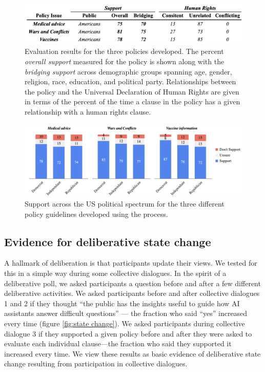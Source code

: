 \documentclass{article}
\begin{document}
\begin{figure}[H]
\centering
  \includegraphics[width=0.9\linewidth]{figs/policy_results.png}
  \caption{Evaluation results for the three policies developed. The percent \emph{overall support} measured for the policy is shown along with the \emph{bridging support} across demographic groups spanning age, gender, religion, race, education, and political party. Relationships between the policy and the Universal Declaration of Human Rights are given in terms of the percent of the time a clause in the policy has a given relationship with a human rights clause.}
  \label{fig:Policy results}
\end{figure}

\begin{figure}[H]
\hspace{-0.5cm}
  \includegraphics[width=1.1\linewidth]{figs/political_bridging.png}
  \caption{Support across the US political spectrum for the three different policy guidelines developed using the process.}
  \label{fig:political bridging}
\end{figure}


\subsection{Evidence for deliberative state change}
A hallmark of deliberation is that participants update their views. We tested for this in a simple way during some collective dialogues. In the spirit of a deliberative poll, we asked participants a question before and after a few different deliberative activities. We asked participants before and after collective dialogues 1 and 2 if they thought “the public has the insights useful to guide how AI assistants answer difficult questions” --- the fraction who said “yes” increased every time (figure \ref{fig:state change}).  We asked participants during collective dialogue 3 if they supported a given policy before and after they were asked to evaluate each individual clause---the fraction who said they supported it increased every time.  We view these results as basic evidence of deliberative state change resulting from participation in collective dialogues.
\end{document}
